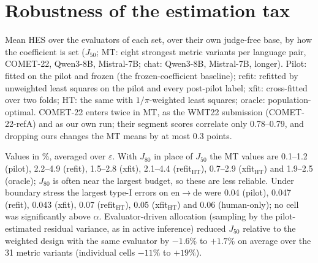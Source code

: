 \documentclass[11pt]{article}
\newcommand{\eps}{\varepsilon}
\newcommand{\Jt}{J_{50}}
\begin{document}
\section{Robustness of the estimation tax}\label{app:robust}
Mean HES over the evaluators of each set, over their own judge-free base, by how the coefficient is set ($\Jt$; MT:
eight strongest metric variants per language pair, COMET-22, Qwen3-8B, Mistral-7B; chat: Qwen3-8B, Mistral-7B,
longer). Pilot: fitted on the pilot and frozen (the frozen-coefficient baseline); refit: refitted by unweighted least squares on the pilot
and every post-pilot label; xfit: cross-fitted over two folds; HT: the same with $1/\pi$-weighted least squares;
oracle: population-optimal. COMET-22 enters twice in MT, as the WMT22 submission (COMET-22-refA) and as our own run;
their segment scores correlate only 0.78--0.79, and dropping ours changes the MT means by at most 0.3 points.

\begin{center}\footnotesize{}\end{center}
Values in \%, averaged over $\eps$. With $J_{80}$ in place of $\Jt$ the MT values are 0.1--1.2 (pilot), 2.2--4.9 (refit),
1.5--2.8 (xfit), 2.1--4.4 (refit$_{\mathrm{HT}}$), 0.7--2.9 (xfit$_{\mathrm{HT}}$) and 1.9--2.5 (oracle); $J_{80}$ is often near
the largest budget, so these are less reliable. Under boundary stress the largest type-I errors on en$\to$de were 0.04 (pilot), 0.047 (refit),
0.043 (xfit), 0.07 (refit$_{\mathrm{HT}}$), 0.05 (xfit$_{\mathrm{HT}}$) and 0.06 (human-only); no cell was significantly
above $\alpha$. Evaluator-driven allocation (sampling by the pilot-estimated residual
variance, as in active inference) reduced $\Jt$ relative to the weighted design with the same evaluator by $-1.6\%$ to
$+1.7\%$ on average over the 31 metric variants (individual cells $-11\%$ to $+19\%$).
\end{document}
